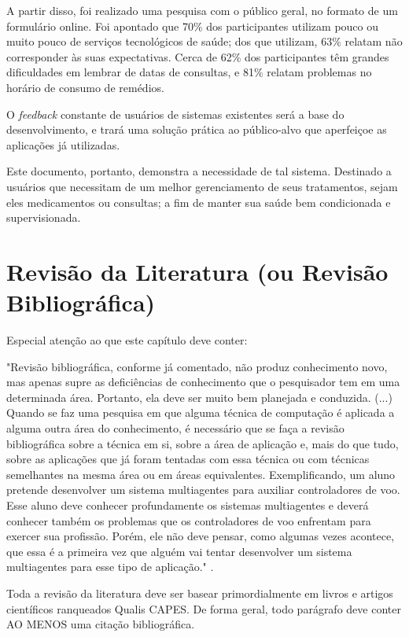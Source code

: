 \documentclass[
	article,			%
	12pt,				%
	oneside,			%
	a4paper,			%
    BIBLATEX,           %
	english,			%
	brazil,				%
	sumario=tradicional
	]{abntex2}
\begin{document}
A partir disso, foi realizado uma pesquisa com o público geral, no formato de um formulário online. Foi apontado que 70\% dos participantes utilizam pouco ou muito pouco de serviços tecnológicos de saúde; dos que utilizam, 63\% relatam não corresponder às suas expectativas. Cerca de 62\% dos participantes têm grandes dificuldades em lembrar de datas de consultas, e 81\% relatam problemas no horário de consumo de remédios.

O \textit{feedback} constante de usuários de sistemas existentes será a base do desenvolvimento, e trará uma solução prática ao público-alvo que aperfeiçoe as aplicações já utilizadas.

Este documento, portanto, demonstra a necessidade de tal sistema. Destinado a usuários que necessitam de um melhor gerenciamento de seus tratamentos, sejam eles medicamentos ou consultas; a fim de manter sua saúde bem condicionada e supervisionada.

\section{Revisão da Literatura (ou Revisão Bibliográfica)}

Especial atenção ao que este capítulo deve conter:
    \begin{citacao}
    "Revisão bibliográfica, conforme já comentado, não produz conhecimento novo, mas apenas supre as
    deficiências de conhecimento que o pesquisador tem em uma determinada área. Portanto, ela deve ser muito
    bem planejada e conduzida.
    (...)
    Quando se faz uma pesquisa em que alguma técnica de computação é aplicada a alguma outra área do
    conhecimento, é necessário que se faça a revisão bibliográfica sobre a técnica em si, sobre a área de aplicação e,
    mais do que tudo, sobre as aplicações que já foram tentadas com essa técnica ou com técnicas semelhantes na
    mesma área ou em áreas equivalentes. Exemplificando, um aluno pretende desenvolver um sistema
    multiagentes para auxiliar controladores de voo. Esse aluno deve conhecer profundamente os sistemas
    multiagentes e deverá conhecer também os problemas que os controladores de voo enfrentam para exercer sua
    profissão. Porém, ele não deve pensar, como algumas vezes acontece, que essa é a primeira vez que alguém vai
    tentar desenvolver um sistema multiagentes para esse tipo de aplicação."
    \cite{PESQUISA:RAUL}.
    \end{citacao}

Toda a revisão da literatura deve ser basear primordialmente em livros e artigos científicos ranqueados Qualis CAPES. De forma geral, todo parágrafo deve conter AO MENOS uma citação bibliográfica.
\end{document}
